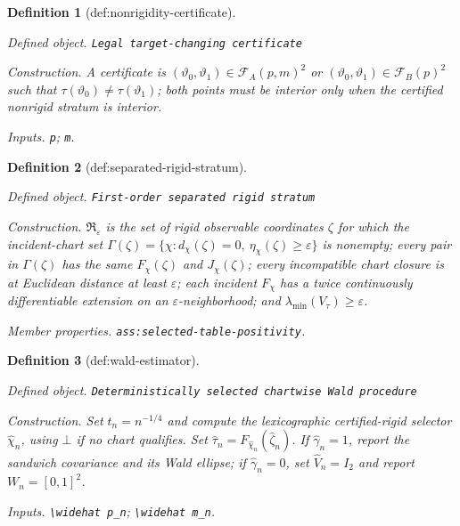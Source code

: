 \documentclass{article}
\newtheorem{definition}{Definition}
\begin{document}
\begin{definition}[def:nonrigidity-certificate]\label{def:nonrigidity-certificate}
\par\smallskip\noindent\emph{Defined object.} \texttt{Legal target-\allowbreak{}changing certificate}
\par\smallskip\noindent\emph{Construction.} A certificate is \((\vartheta_0,\vartheta_1)\in\mathcal F_A(p,m)^2\) or \((\vartheta_0,\vartheta_1)\in\mathcal F_B(p)^2\) such that \(\tau(\vartheta_0)\ne\tau(\vartheta_1)\); both points must be interior only when the certified nonrigid stratum is interior.
\par\smallskip\noindent\emph{Inputs.} \texttt{p}; \texttt{m}.
\end{definition}

\begin{definition}[def:separated-rigid-stratum]\label{def:separated-rigid-stratum}
\par\smallskip\noindent\emph{Defined object.} \texttt{First-\allowbreak{}order separated rigid stratum}
\par\smallskip\noindent\emph{Construction.} \(\mathfrak R_{\varepsilon}\) is the set of rigid observable coordinates \(\zeta\) for which the incident-chart set \(\Gamma(\zeta)=\{\chi:d_{\chi}(\zeta)=0,\ \eta_{\chi}(\zeta)\ge\varepsilon\}\) is nonempty; every pair in \(\Gamma(\zeta)\) has the same \(F_{\chi}(\zeta)\) and \(J_{\chi}(\zeta)\); every incompatible chart closure is at Euclidean distance at least \(\varepsilon\); each incident \(F_{\chi}\) has a twice continuously differentiable extension on an \(\varepsilon\)-neighborhood; and \(\lambda_{\min}(V_{\tau})\ge\varepsilon\).
\par\smallskip\noindent\emph{Member properties.} \texttt{ass:\allowbreak{}selected-\allowbreak{}table-\allowbreak{}positivity}.
\end{definition}

\begin{definition}[def:wald-estimator]\label{def:wald-estimator}
\par\smallskip\noindent\emph{Defined object.} \texttt{Deterministically selected chartwise Wald procedure}
\par\smallskip\noindent\emph{Construction.} Set \(t_n=n^{-1/4}\) and compute the lexicographic certified-rigid selector \(\widehat\chi_n\), using \(\bot\) if no chart qualifies. Set \(\widehat\tau_n=F_{\widehat\chi_n}(\widehat\zeta_n)\). If \(\widehat\gamma_n=1\), report the sandwich covariance and its Wald ellipse; if \(\widehat\gamma_n=0\), set \(\widehat V_n=I_2\) and report \(W_n=[0,1]^2\).
\par\smallskip\noindent\emph{Inputs.} \texttt{\textbackslash{}\allowbreak{}widehat p\_\allowbreak{}n}; \texttt{\textbackslash{}\allowbreak{}widehat m\_\allowbreak{}n}.
\end{definition}
\end{document}
